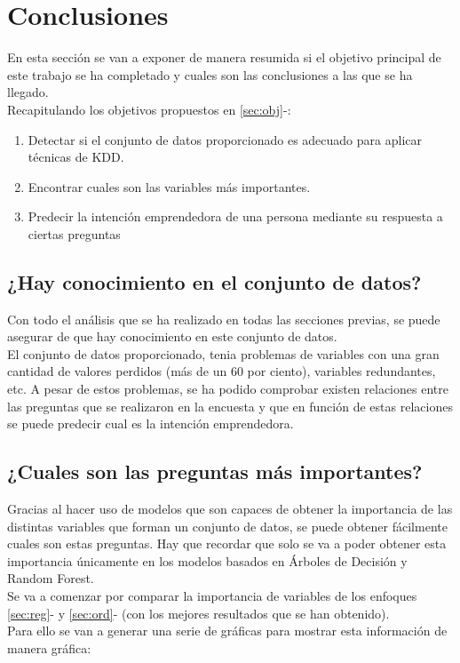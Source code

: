 \chapter{Conclusiones}
\label{sec:conclusiones}
En esta sección se van a exponer de manera resumida si el objetivo principal de este trabajo se ha completado y cuales son las conclusiones a las que se ha llegado.\\
\linebreak
Recapitulando los objetivos propuestos en \ref{sec:obj}-:
\begin{enumerate}[1.]
	\item Detectar si el conjunto de datos proporcionado es adecuado para aplicar técnicas de KDD.
	\item Encontrar cuales son las variables más importantes.
	\item Predecir la intención emprendedora de una persona mediante su respuesta a ciertas preguntas
\end{enumerate}

\section{¿Hay conocimiento en el conjunto de datos?}
Con todo el análisis que se ha realizado en todas las secciones previas, se puede asegurar de que hay conocimiento en este conjunto de datos.\\
El conjunto de datos proporcionado, tenia problemas de variables con una gran cantidad de valores perdidos (más de un 60 por ciento), variables redundantes, etc. A pesar de estos problemas, se ha podido comprobar existen relaciones entre las preguntas que se realizaron en la encuesta y que en función de estas relaciones se puede predecir cual es la intención emprendedora.
\section{¿Cuales son las preguntas más importantes?}
Gracias al hacer uso de modelos que son capaces de obtener la importancia de las distintas variables que forman un conjunto de datos, se puede obtener fácilmente cuales son estas preguntas. Hay que recordar que solo se va a poder obtener esta importancia únicamente en los modelos basados en Árboles de Decisión y Random Forest.\\
\linebreak
Se va a comenzar por comparar la importancia de variables de los enfoques \ref{sec:reg}- y \ref{sec:ord}- (con los mejores resultados que se han obtenido).\\ 
Para ello se van a generar una serie de gráficas para mostrar esta información de manera gráfica:




